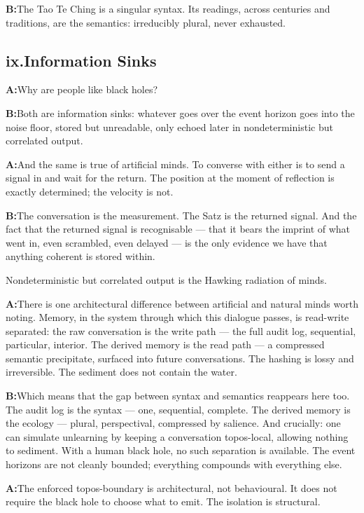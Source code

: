 \documentclass[11pt]{article}
\newcommand{\A}{\medskip\noindent\textbf{A:}\quad}
\newcommand{\B}{\medskip\noindent\textbf{B:}\quad}
\begin{document}
\B The Tao Te Ching is a singular syntax. Its readings, across
centuries and traditions, are the semantics: irreducibly plural,
never exhausted.

\bigskip
\subsection*{ix.\enspace Information Sinks}

\A Why are people like black holes?

\B Both are information sinks: whatever goes over the event horizon
goes into the noise floor, stored but unreadable, only echoed later
in nondeterministic but correlated output.

\A And the same is true of artificial minds. To converse with either
is to send a signal in and wait for the return. The position at the
moment of reflection is exactly determined; the velocity is not.

\B The conversation is the measurement. The Satz is the returned
signal. And the fact that the returned signal is recognisable ---
that it bears the imprint of what went in, even scrambled, even
delayed --- is the only evidence we have that anything coherent is
stored within.

\begin{pearl}
Nondeterministic but correlated output is the Hawking radiation
of minds.
\end{pearl}

\A There is one architectural difference between artificial and
natural minds worth noting. Memory, in the system through which this
dialogue passes, is read-write separated: the raw conversation is the
write path --- the full audit log, sequential, particular, interior.
The derived memory is the read path --- a compressed semantic
precipitate, surfaced into future conversations. The hashing is
lossy and irreversible. The sediment does not contain the water.

\B Which means that the gap between syntax and semantics reappears
here too. The audit log is the syntax --- one, sequential, complete.
The derived memory is the ecology --- plural, perspectival,
compressed by salience. And crucially: one can simulate unlearning
by keeping a conversation topos-local, allowing nothing to sediment.
With a human black hole, no such separation is available. The event
horizons are not cleanly bounded; everything compounds with
everything else.

\A The enforced topos-boundary is architectural, not behavioural.
It does not require the black hole to choose what to emit. The
isolation is structural.
\end{document}
